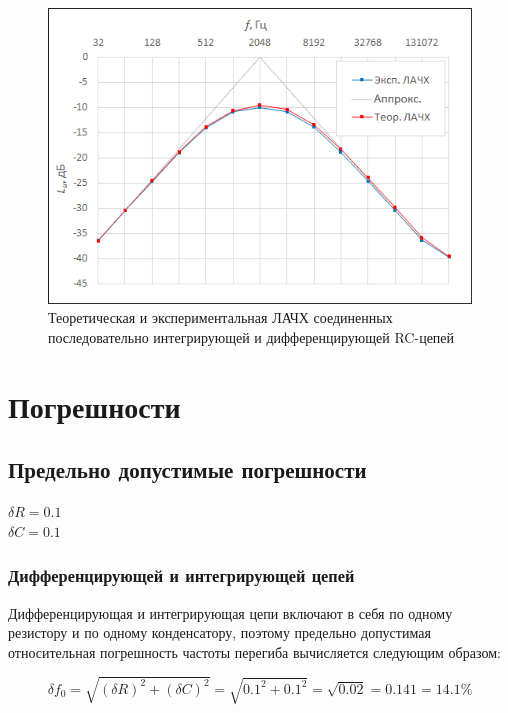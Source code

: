 \begin{figure}[H]
	\begin{center}
		\includegraphics[width=13cm]{3}
		\caption{Теоретическая и экспериментальная ЛАЧХ соединенных
последовательно интегрирующей и дифференцирующей RC-цепей} 
		\label{t:e3} %
	\end{center}
\end{figure}

\section{Погрешности}

\subsection{Предельно допустимые погрешности}

$\delta R = 0.1$\\
$\delta C = 0.1$\\

\subsubsection{Дифференцирующей и интегрирующей цепей}

Дифференцирующая и интегрирующая цепи включают в себя по одному резистору и по одному конденсатору, поэтому предельно допустимая относительная погрешность частоты перегиба вычисляется следующим образом:

\begin{equation}
\delta f_0 = \sqrt{(\delta R)^2 + (\delta C)^2} = \sqrt{0.1^2 + 0.1^2} = \sqrt{0.02} = 0.141 = 14.1 \%
\end{equation}

